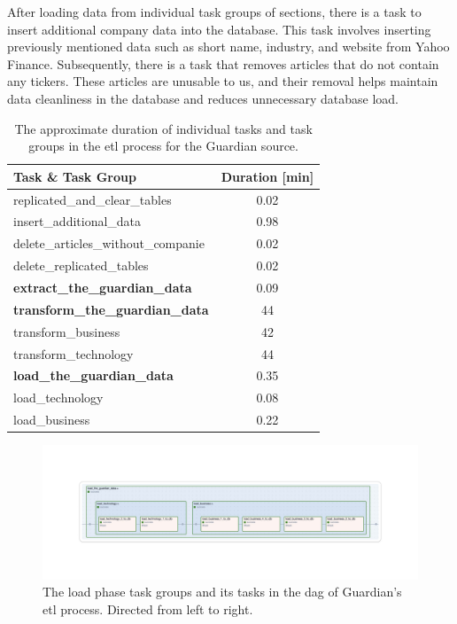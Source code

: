 After loading data from individual task groups of sections, there is a task to insert additional company data into the database. This task involves inserting previously mentioned data such as short name, industry, and website from Yahoo Finance. Subsequently, there is a task that removes articles that do not contain any tickers. These articles are unusable to us, and their removal helps maintain data cleanliness in the database and reduces unnecessary database load.

\begin{table}[ht]
    \centering
    \caption{The approximate duration of individual tasks and task groups in the \acrshort{etl} process for the Guardian source.}
    \label{table:etl-task-durations}
    \begin{tabular}{l c}
        \hline
        \textbf{Task \& Task Group} & \textbf{Duration [min]} \\
        \hline
        replicated\_and\_clear\_tables & 0.02 \\
        insert\_additional\_data & 0.98 \\
        delete\_articles\_without\_companie & 0.02 \\
        delete\_replicated\_tables & 0.02 \\
        \hline
        \textbf{extract\_the\_guardian\_data} & 0.09 \\
        \hline
        \textbf{transform\_the\_guardian\_data} & 44 \\
        \hline
        transform\_business & 42 \\
        transform\_technology & 44 \\
        \hline
        \textbf{load\_the\_guardian\_data} & 0.35 \\
        \hline
        load\_technology & 0.08 \\
        load\_business & 0.22 \\
        \hline
    \end{tabular}
\end{table}

\begin{figure}[ht]
    \centering
    \includegraphics[width=\textwidth]{img/architecture/etl-load.pdf}
    \caption{The load phase task groups and its tasks in the \acrshort{dag} of Guardian's \acrshort{etl} process. Directed from left to right.}
    \label{fig:architecture-etl-load}
\end{figure}

